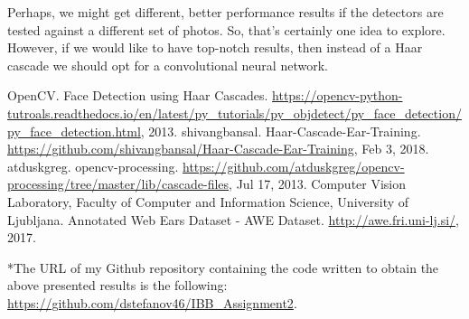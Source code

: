 \documentclass[9pt]{IEEEtran}
\begin{document}
Perhaps, we might get different, better performance results if the detectors are tested against a different set of photos. So, that's certainly one idea to explore. However, if we would like to have top-notch results, then instead of a Haar cascade we should opt for a convolutional neural network.


\begin{thebibliography}{99}
 OpenCV. Face Detection using Haar Cascades. \url{https://opencv-python-tutroals.readthedocs.io/en/latest/py_tutorials/py_objdetect/py_face_detection/py_face_detection.html}, 2013.
 shivangbansal. Haar-Cascade-Ear-Training. \url{https://github.com/shivangbansal/Haar-Cascade-Ear-Training}, Feb 3, 2018.
 atduskgreg. opencv-processing. \url{https://github.com/atduskgreg/opencv-processing/tree/master/lib/cascade-files}, Jul 17, 2013.
 Computer Vision Laboratory, Faculty of Computer and Information Science, University of Ljubljana. Annotated Web Ears Dataset - AWE Dataset. \url{http://awe.fri.uni-lj.si/}, 2017.
\end{thebibliography}

*The URL of my Github repository containing the code written to obtain the above presented results is the following: \url{https://github.com/dstefanov46/IBB_Assignment2}.
\end{document}
